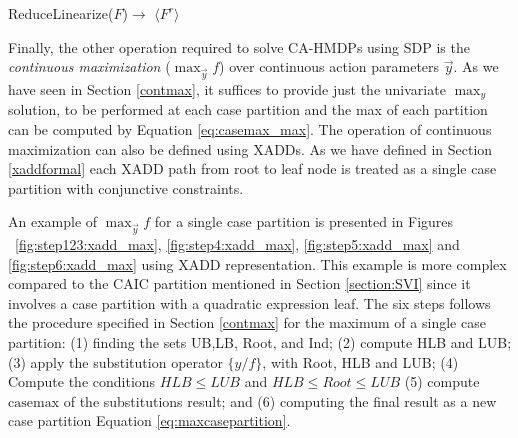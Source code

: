 \documentclass[twoside,11pt]{article}
\newcommand{\casemax}{\mathrm{casemax}}
\newcommand{\Root}{\mathit{Root}}
\begin{document}
\incmargin{0.5em}
\linesnumbered
\begin{algorithm}[t!]
\dontprintsemicolon
{}

\BlankLine
{}
\caption{{\sc ReduceLinearize}($F$)$\longrightarrow$ $\langle F^r \rangle$  \label{algLinearize}}
\end{algorithm}
\decmargin{.5em}

Finally, the other operation required to solve CA-HMDPs using SDP is the \emph{continuous maximization} ($\max_{\vec{y}} f$) over continuous action parameters $\vec{y}$. As we have seen in Section \ref{contmax}, it suffices to provide just the univariate $\max_{y}$ solution, to be performed at each case partition and the max of each partition can be computed by Equation \ref{eq:casemax_max}. The operation of continuous maximization can also be defined using XADDs. As we have defined in Section \ref{xaddformal} each XADD path from root to leaf node is treated as a single case partition with conjunctive constraints. 

An example of $\max_{\vec{y}} f$ for a single case partition is presented in Figures ~\ref{fig:step123:xadd_max}, \ref{fig:step4:xadd_max}, \ref{fig:step5:xadd_max} and \ref{fig:step6:xadd_max} using XADD representation. This example is more complex compared to the CAIC partition mentioned in Section \ref{section:SVI} since it involves a case partition with a quadratic expression leaf. The six steps  follows the procedure specified in Section \ref{contmax} for the maximum of a single case partition: (1) finding the sets UB,LB, Root, and Ind; (2) compute HLB and LUB; (3) apply the substitution operator $\{y/f\}$, with Root, HLB and LUB; (4) Compute the conditions $HLB \leq LUB$ and $HLB \leq \Root \leq LUB$ (5) compute $\casemax$ of the substitutions result; and (6) computing the final result as a new case partition Equation \ref{eq:maxcasepartition}.
\end{document}
